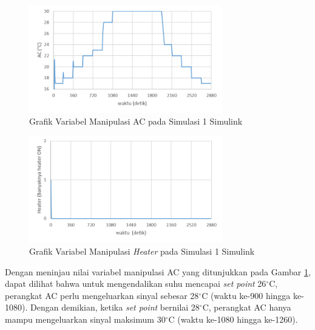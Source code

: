 \begin{figure}[!h]
	\centering
	\includegraphics[width=0.75\textwidth]{figures/Simulink1AC}
	\caption{Grafik Variabel Manipulasi AC pada Simulasi 1 Simulink}
	\label{fig:5:SimulinkAC}
\end{figure}

\begin{figure}[!h]
	\centering
	\includegraphics[width=0.75\textwidth]{figures/Simulink1HT}
	\caption{Grafik Variabel Manipulasi \textit{Heater} pada Simulasi 1 Simulink}
	\label{fig:5:SimulinkHT}
\end{figure}
\vspace{1em}

Dengan meninjau nilai variabel manipulasi AC yang ditunjukkan pada Gambar \ref{fig:5:SimulinkAC}, dapat dilihat bahwa untuk mengendalikan suhu mencapai \textit{set point} 26$^\circ$C, perangkat AC perlu mengeluarkan sinyal sebesar 28$^\circ$C (waktu ke-900 hingga ke-1080). Dengan demikian, ketika \textit{set point} bernilai 28$^\circ$C, perangkat AC hanya mampu mengeluarkan sinyal maksimum 30$^\circ$C (waktu ke-1080 hingga ke-1260).

